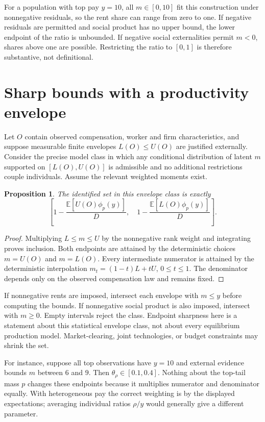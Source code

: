 \documentclass[11pt]{article}
\newtheorem{proposition}{Proposition}
\begin{document}
For a population with top pay $y=10$, all $m\in[0,10]$ fit this construction under nonnegative residuals, so the rent share can range from zero to one. If negative residuals are permitted and social product has no upper bound, the lower endpoint of the ratio is unbounded. If negative social externalities permit $m<0$, shares above one are possible. Restricting the ratio to $[0,1]$ is therefore substantive, not definitional.

\section{Sharp bounds with a productivity envelope}
Let $O$ contain observed compensation, worker and firm characteristics, and suppose measurable finite envelopes $L(O)\leq U(O)$ are justified externally. Consider the precise model class in which any conditional distribution of latent $m$ supported on $[L(O),U(O)]$ is admissible and no additional restrictions couple individuals. Assume the relevant weighted moments exist.

\begin{proposition}
The identified set in this envelope class is exactly
\[
 \left[1-\frac{\mathbb E[U(O)\phi_p(y)]}{D},\quad
       1-\frac{\mathbb E[L(O)\phi_p(y)]}{D}\right].
\]
\end{proposition}
\begin{proof}
Multiplying $L\leq m\leq U$ by the nonnegative rank weight and integrating proves inclusion. Both endpoints are attained by the deterministic choices $m=U(O)$ and $m=L(O)$. Every intermediate numerator is attained by the deterministic interpolation $m_t=(1-t)L+tU$, $0\leq t\leq1$. The denominator depends only on the observed compensation law and remains fixed.
\end{proof}
If nonnegative rents are imposed, intersect each envelope with $m\leq y$ before computing the bounds. If nonnegative social product is also imposed, intersect with $m\geq0$. Empty intervals reject the class. Endpoint sharpness here is a statement about this statistical envelope class, not about every equilibrium production model. Market-clearing, joint technologies, or budget constraints may shrink the set.

For instance, suppose all top observations have $y=10$ and external evidence bounds $m$ between $6$ and $9$. Then $\theta_\rho\in[0.1,0.4]$. Nothing about the top-tail mass $p$ changes these endpoints because it multiplies numerator and denominator equally. With heterogeneous pay the correct weighting is by the displayed expectations; averaging individual ratios $\rho/y$ would generally give a different parameter.
\end{document}
